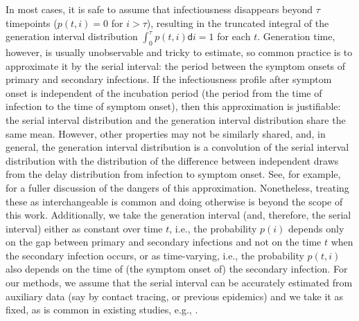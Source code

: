 \documentclass[10pt,letterpaper]{article}
\def\diff{\mathsf{d}}
\newcommand{\citep}[1]{\cite{#1}}
\begin{document}
In most cases, it is safe to assume that infectiousness disappears beyond 
$\tau$ timepoints ($p(t,i) = 0$ for $i > \tau$), resulting in the truncated integral 
of the generation interval distribution $\int_0^\tau p(t,i)\diff i = 1$ for each $t$.
Generation time, however, is usually unobservable and tricky to estimate, so
common practice is to approximate it by the serial interval: the period between
the symptom onsets of primary and secondary infections. If the infectiousness
profile after symptom onset is independent of the incubation period (the period
from the time of infection to the time of symptom onset), then this
approximation is justifiable: the serial interval distribution and the
generation interval distribution share the same mean. However, other properties
may not be similarly shared, and, in general, the generation interval
distribution is a convolution of the serial interval distribution with the
distribution of the difference between independent draws from the delay
distribution from infection to symptom onset. See, for example,
\cite{gostic2020practical} for a fuller discussion of the dangers of this
approximation. Nonetheless, treating these as interchangeable is common
\citep{cori2013new,park2021forward} and doing otherwise is beyond the scope of this work. 
Additionally, we take the generation interval (and, therefore, the 
serial interval) either as constant over time $t$, i.e., the probability $p(i)$ 
depends only on the gap between primary and secondary infections and not on 
the time $t$ when the secondary infection occurs, or as time-varying, i.e., 
the probability $p(t,i)$ also depends on the time of (the symptom onset of)
the secondary infection. For our methods, we 
assume that the serial interval can be accurately estimated from auxiliary 
data (say by contact tracing, or previous epidemics) and we take it as 
fixed, as is common in existing studies, e.g., 
\cite{cori2013new,abry2020spatial,pascal2022nonsmooth}.
\end{document}
